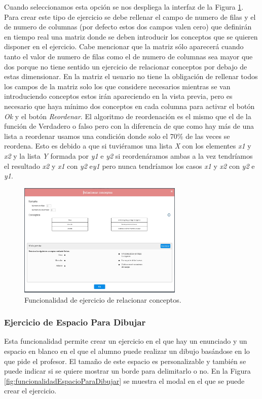 Cuando seleccionamos esta opción se nos despliega la interfaz de la Figura \ref{fig:funcionalidadRelacionarConceptos}. Para crear este tipo de ejercicio se debe rellenar el campo de numero de filas y el de numero de columnas (por defecto estos dos campos valen cero) que definirán en tiempo real una matriz donde se deben introducir los conceptos que se quieren disponer en el ejercicio. Cabe mencionar que la matriz sólo aparecerá cuando tanto el valor de numero de filas como el de numero de columnas sea mayor que dos porque no tiene sentido un ejercicio de relacionar conceptos por debajo de estas dimensionar. En la matriz el usuario no tiene la obligación de rellenar todos los campos de la matriz solo los que considere necesarios mientras se van introduciendo conceptos estos irán apareciendo en la vista previa, pero es necesario que haya mínimo dos conceptos en cada columna para activar el botón \textit{Ok} y el botón \textit{Reordenar}. El algoritmo de reordenación es el mismo que el de la función de Verdadero o falso pero con la diferencia de que como hay más de una lista a reordenar usamos una condición donde solo el 70\% de las veces se reordena. Esto es debido a que si tuviéramos una lista \textit{X} con los elementes \textit{x1} y \textit {x2} y la lista \textit {Y} formada por \textit {y1} e \textit{y2} si reordenáramos ambas a la vez tendríamos el resultado \textit{x2} y \textit{x1} con \textit{y2} e\textit{y1} pero nunca tendríamos los casos \textit{x1}  y \textit{x2} con \textit{y2} e \textit{y1}.

\begin{figure}[ht!]
  \centering
  \includegraphics[width=0.7\textwidth]{Imagenes/Funcionalidades/RelacionarConceptos.jpg}
  \caption{Funcionalidad de ejercicio de relacionar conceptos.}
  \label{fig:funcionalidadRelacionarConceptos}
\end{figure}

\subsubsection{Ejercicio de Espacio Para Dibujar}
\label{sec:impespacioparadibujar}
Esta funcionalidad permite crear un ejercicio en el que hay un enunciado y un espacio en blanco en el que el alumno puede realizar un dibujo basándose en lo que pide el profesor. El tamaño de este espacio es personalizable y también se puede indicar si se quiere mostrar un borde para delimitarlo o no. En la Figura \ref{fig:funcionalidadEspacioParaDibujar} se muestra el modal en el que se puede crear el ejercicio.


